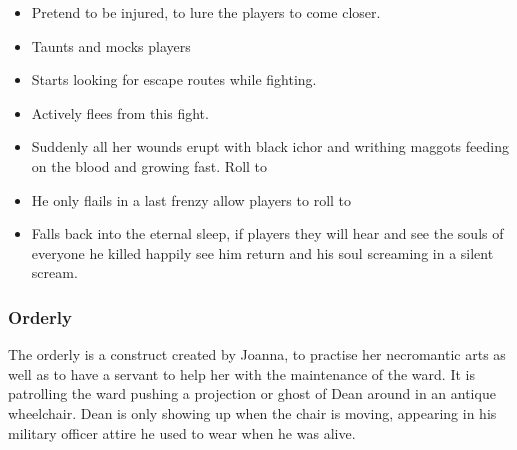 \begin{itemize}[noitemsep]
  \item Pretend to be injured, to lure the players to come closer.
  \item Taunts and mocks players
  \item Starts looking for escape routes while fighting.
  \item Actively flees from this fight.
  \item Suddenly all her wounds erupt with black ichor and writhing maggots feeding on the blood and growing fast.  Roll to
  \item He only flails in a last frenzy allow players to roll  to 
  \item[\KULTgold{\skull}] Falls back into the eternal sleep, if players  they will
        hear and see the souls of everyone he killed happily see him return and his soul screaming in a silent scream.
\end{itemize}

\subsubsection{Orderly}%
\label{ssub:orderly}
The orderly is a construct created by Joanna, to practise her necromantic arts as well as to have a servant to help her with
the maintenance of the ward. It is patrolling the ward pushing a projection or ghost of Dean around in an antique wheelchair.
Dean is only showing up when the chair is moving, appearing in his military officer attire he used to wear when he was alive.

